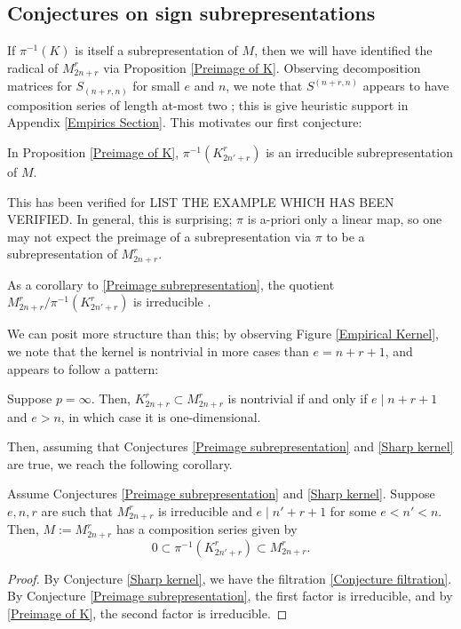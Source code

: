 \documentclass{amsart}
\begin{document}
 \subsection{Conjectures on sign subrepresentations}\label{Conjecture Section}
 If $\pi^{-1}(K)$ is itself a subrepresentation of $M$, then we will have identified the radical of $M_{2n + r}^r$ via Proposition \ref{Preimage of K}.
 Observing decomposition matrices for $S_{(n+r,n)}$ for small $e$ and $n$, we note that $S^{(n+r,n)}$ appears to have composition series of length at-most two \cite[Appendix~B]{Mathas-book};
 this is give heuristic support in Appendix \ref{Empirics Section}.
 This motivates our first conjecture:
 \begin{conjecture}\label{Preimage subrepresentation}
   In Proposition \ref{Preimage of K}, $\pi^{-1}(K_{2n' + r}^r)$ is an irreducible subrepresentation of $M$.
 \end{conjecture}
 This has been verified for {\color{magenta} LIST THE EXAMPLE WHICH HAS BEEN VERIFIED}.
 In general, this is surprising;
 $\pi$ is a-priori only a linear map, so one may not expect the preimage of a subrepresentation via $\pi$ to be a subrepresentation of $M_{2n + r}^r$.
  
  \begin{remark}
    As a corollary to \ref{Preimage subrepresentation}, the quotient $M_{2n + r}^r / \pi^{-1}(K_{2n' + r}^r)$ is irreducible \cite[Thm.~10.4]{Dummit}.
  \end{remark}

  We can posit more structure than this;
 by observing Figure \ref{Empirical Kernel}, we note that the kernel is nontrivial in more cases than $e = n + r + 1$, and appears to follow a pattern: 
 \begin{conjecture}\label{Sharp kernel}
 	Suppose $p = \infty$.
  Then, $K_{2n + r}^r \subset M_{2n + r}^r$ is nontrivial if and only if $e \mid n + r + 1$ and $e > n$, in which case it is one-dimensional.
 \end{conjecture} 
 Then, assuming that Conjectures \ref{Preimage subrepresentation} and \ref{Sharp kernel} are true, we reach the following corollary.
 \begin{corollary}
  Assume Conjectures \ref{Preimage subrepresentation} and \ref{Sharp kernel}.
 	Suppose $e,n,r$ are such that $M_{2n + r}^r$ is irreducible and $e \mid n' + r + 1$ for some $e < n' < n$.
 	Then, $M := M_{2n + r}^r$ has a composition series given by \begin{equation}\label{Conjecture filtration}
    0 \subset \pi^{-1}(K_{2n' + r}^r) \subset M_{2n + r}^r.\end{equation}
 \end{corollary}
 \begin{proof}
 	By Conjecture \ref{Sharp kernel}, we have the filtration \eqref{Conjecture filtration}.
 	By Conjecture \ref{Preimage subrepresentation}, the first factor is irreducible, and by \ref{Preimage of K}, the second factor is irreducible.
 \end{proof}
 
\end{document}
